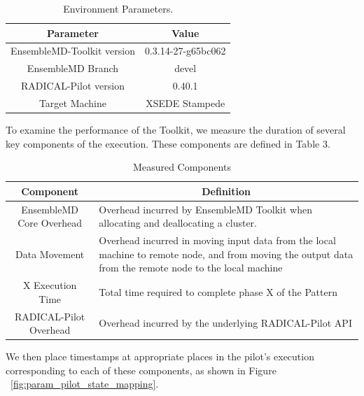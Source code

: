 \documentclass[]{article}
\begin{document}
	\begin{table}[H]
		\centering
		\begin{tabular}{|c|c|}
				\hline
				Parameter & Value \\
				\hline
				\hline
				EnsembleMD-Toolkit version & 0.3.14-27-g65bc062 \\
				\hline
				EnsembleMD Branch & devel \\
				\hline
				RADICAL-Pilot version & 0.40.1 \\
				\hline
				Target Machine & XSEDE Stampede \\
				\hline
		\end{tabular}
		\caption{Environment Parameters.}
		\label{table:environment_variables}
	\end{table}

	To examine the performance of the Toolkit, we measure the duration of several key components of the execution. These components are defined in Table 3.

	\begin{table}[H]
		\centering
		\begin{tabular}{|c|p{10cm}|}
				\hline
				Component & \multicolumn{1}{|c|}{Definition} \\
				\hline
				\hline
				EnsembleMD Core Overhead & Overhead incurred by EnsembleMD Toolkit when allocating and deallocating a cluster. \\
				\hline
				Data Movement &  Overhead incurred in moving input data from the local machine to remote node, and from moving the output data from the remote node to the local machine\\
				\hline
				X Execution Time & Total time required to complete phase X of the Pattern\\
				\hline
				RADICAL-Pilot Overhead & Overhead incurred by the underlying RADICAL-Pilot API \\
				\hline
		\end{tabular}
		\caption{Measured Components}
		\label{table:measured_components}
	\end{table}

	We then place timestamps at appropriate places in the pilot's execution corresponding to each of these components, as shown in Figure ~\ref{fig:param_pilot_state_mapping}.
\end{document}

